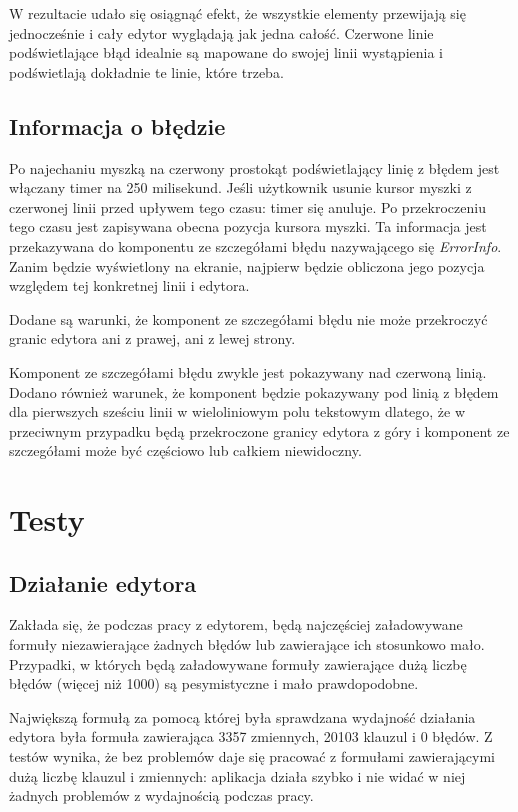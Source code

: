 \documentclass[a4paper,12pt]{book}
\theoremstyle{definition}
\begin{document}
W rezultacie udało się osiągnąć efekt, że wszystkie elementy przewijają się jednocześnie i cały edytor wyglądają jak jedna całość. Czerwone linie podświetlające błąd idealnie są mapowane do swojej linii wystąpienia i podświetlają dokładnie te linie, które trzeba.

\subsection{Informacja o błędzie}

Po najechaniu myszką na czerwony prostokąt podświetlający linię z błędem jest włączany timer na 250 milisekund. Jeśli użytkownik usunie kursor myszki z czerwonej linii przed upływem tego czasu: timer się anuluje. Po przekroczeniu tego czasu jest zapisywana obecna pozycja kursora myszki. Ta informacja jest przekazywana do komponentu ze szczegółami błędu nazywającego się \textit{ErrorInfo}. Zanim będzie wyświetlony na ekranie, najpierw będzie obliczona jego pozycja względem tej konkretnej linii i edytora. 

Dodane są warunki, że komponent ze szczegółami błędu nie może przekroczyć granic edytora ani z prawej, ani z lewej strony. 

Komponent ze szczegółami błędu zwykle jest pokazywany nad czerwoną linią. Dodano również warunek, że komponent będzie pokazywany pod linią z błędem dla pierwszych sześciu linii w wieloliniowym polu tekstowym dlatego, że w przeciwnym przypadku będą przekroczone granicy edytora z góry i komponent ze szczegółami może być częściowo lub całkiem niewidoczny.

\section{Testy}

\subsection{Działanie edytora}

Zakłada się, że podczas pracy z edytorem, będą najczęściej załadowywane formuły niezawierające żadnych błędów lub zawierające ich stosunkowo mało. Przypadki, w których będą załadowywane formuły zawierające dużą liczbę błędów (więcej niż 1000) są pesymistyczne i mało prawdopodobne.

Największą formułą za pomocą której była sprawdzana wydajność działania edytora była formuła zawierająca 3357 zmiennych, 20103 klauzul i 0 błędów. Z testów wynika, że bez problemów daje się pracować z formułami zawierającymi dużą liczbę klauzul i zmiennych: aplikacja działa szybko i nie widać w niej żadnych problemów z wydajnością podczas pracy.
\end{document}
